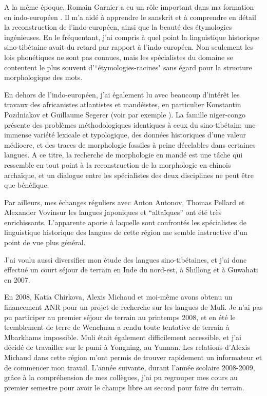 \documentclass[oldfontcommands,oneside,a4paper,11pt]{memoir}
\begin{document}
A la même époque,   Romain Garnier  a eu un rôle important dans ma formation   en indo-européen . Il m'a aidé à apprendre le sanskrit et à comprendre en détail la reconstruction de l'indo-européen, ainsi que la beauté des étymologies ingénieuses. En le fréquentant, j'ai compris à quel point la linguistique historique sino-tibétaine avait du retard par rapport à l'indo-européen. Non seulement les lois phonétiques ne sont pas connues, mais les spécialistes du domaine se contentent le plus souvent  d'``étymologies-racines" sans égard pour la structure morphologique des mots. 

En dehors de l'indo-européen, j'ai également lu avec beaucoup d'intérêt les travaux   des africanistes atlantistes et mandéistes, en particulier Konstantin Pozdniakov et Guillaume Segerer (voir par exemple \citealt{pozdniakov93atlantique}). La famille niger-congo présente des problèmes méthodologiques identiques à ceux du sino-tibétain: une immense variété lexicale et typologique, des données historiques d'une valeur médiocre, et des traces de morphologie fossiles à peine décelables dans certaines langues. A ce titre, la recherche de morphologie en mandé est une tâche qui ressemble en tout point à la reconstruction de la morphologie en chinois archaïque, et un dialogue entre les spécialistes des deux disciplines ne peut être que bénéfique.


Par ailleurs, mes échanges réguliers avec Anton Antonov, Thomas Pellard et Alexander Vovinsur les langues japoniques et ``altaïques'' ont été très enrichissants. L'apparente aporie à laquelle sont confrontés les spécialistes de linguistique historique des langues de cette région me semble instructive d'un point de vue plus général. 



J'ai voulu aussi diversifier mon étude des langues sino-tibétaines, et j'ai donc effectué un court séjour de terrain en Inde du nord-est, à Shillong et à Guwahati en 2007.

En 2008,   Katia Chirkova, Alexis Michaud et moi-même avons   obtenu un financement ANR pour un  projet de recherche sur les langues de Muli. Je n'ai pas pu participer au premier séjour de terrain au printemps 2008, et en été le tremblement de terre de Wenchuan a rendu toute tentative de terrain à Mbarkhams impossible. Muli était également difficilement accessible, et j'ai décidé de travailler sur le pumi à Yongning, au Yunnan. Les relations d'Alexis Michaud dans cette région m'ont permis de trouver rapidement un informateur et de commencer mon travail. L'année suivante, durant l'année scolaire 2008-2009, grâce à la compréhension de mes collègues, j'ai pu regrouper mes cours  au premier semestre pour avoir le champs libre au second pour faire du terrain. 
\end{document}

